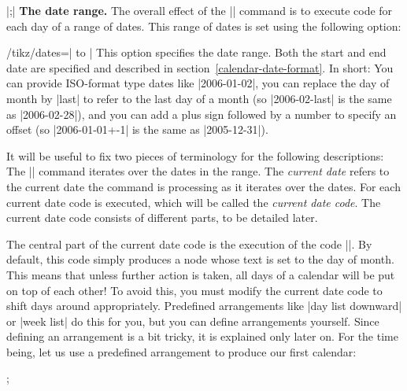 \begin{command}{\calendar {}|;|}
    \medskip
    \textbf{The date range.}
    The overall effect of the |\calendar| command is to execute code for each
    day of a range of dates. This range of dates is set using the following
    option:
    \begin{key}{/tikz/dates=| to |}
        This option specifies the date range. Both the start and end date are
        specified and described in section~\ref{calendar-date-format}. In
        short: You can provide ISO-format type dates like |2006-01-02|, you can
        replace the day of month by |last| to refer to the last day of a month
        (so |2006-02-last| is the same as |2006-02-28|), and you can add a plus
        sign followed by a number to specify an offset (so |2006-01-01+-1| is
        the same as |2005-12-31|).
    \end{key}
    It will be useful to fix two pieces of terminology for the following
    descriptions: The |\calendar| command iterates over the dates in the range.
    The \emph{current date} refers to the current date the command is
    processing as it iterates over the dates. For each current date code is
    executed, which will be called the \emph{current date code}. The current
    date code consists of different parts, to be detailed later.

    The central part of the current date code is the execution of the code
    |\tikzdaycode|. By default, this code simply produces a node whose text is
    set to the day of month. This means that unless further action is taken,
    all days of a calendar will be put on top of each other! To avoid this, you
    must modify the current date code to shift days around appropriately.
    Predefined arrangements like |day list downward| or |week list| do this for
    you, but you can define arrangements yourself. Since defining an
    arrangement is a bit tricky, it is explained only later on. For the time
    being, let us use a predefined arrangement to produce our first calendar:
\begin{codeexample}[preamble={\usetikzlibrary{calendar}}]
\tikz \calendar[dates=2000-01-01 to 2000-01-31,week list];
\end{codeexample}



\end{command}
